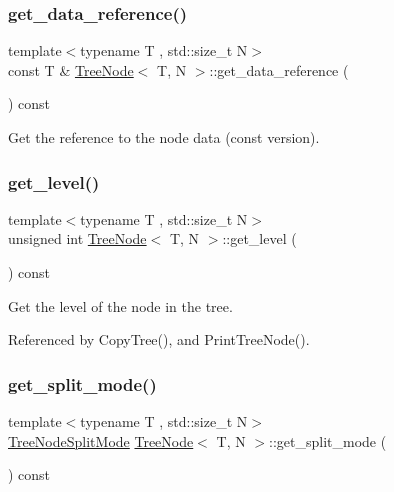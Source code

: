 \subsubsection{\texorpdfstring{get\+\_\+data\+\_\+reference()}{get\_data\_reference()}\hspace{0.1cm}{\footnotesize\ttfamily [2/2]}}
{\footnotesize\ttfamily template$<$typename T , std\+::size\+\_\+t N$>$ \\
const T \& \hyperlink{classTreeNode}{Tree\+Node}$<$ T, N $>$\+::get\+\_\+data\+\_\+reference (\begin{DoxyParamCaption}{ }\end{DoxyParamCaption}) const}

Get the reference to the node data (const version). \mbox{\label{classTreeNode_acdf29b3bf8f5f9c5e04baaa9fd71fb4c}} 
\subsubsection{\texorpdfstring{get\+\_\+level()}{get\_level()}}
{\footnotesize\ttfamily template$<$typename T , std\+::size\+\_\+t N$>$ \\
unsigned int \hyperlink{classTreeNode}{Tree\+Node}$<$ T, N $>$\+::get\+\_\+level (\begin{DoxyParamCaption}{ }\end{DoxyParamCaption}) const}

Get the level of the node in the tree. 

Referenced by Copy\+Tree(), and Print\+Tree\+Node().

\mbox{\label{classTreeNode_a219944254f78755b181cad0ee621835f}} 
\subsubsection{\texorpdfstring{get\+\_\+split\+\_\+mode()}{get\_split\_mode()}}
{\footnotesize\ttfamily template$<$typename T , std\+::size\+\_\+t N$>$ \\
\hyperlink{tree_8h_a922ca07db9633957939f697a65aff11d}{Tree\+Node\+Split\+Mode} \hyperlink{classTreeNode}{Tree\+Node}$<$ T, N $>$\+::get\+\_\+split\+\_\+mode (\begin{DoxyParamCaption}{ }\end{DoxyParamCaption}) const}

